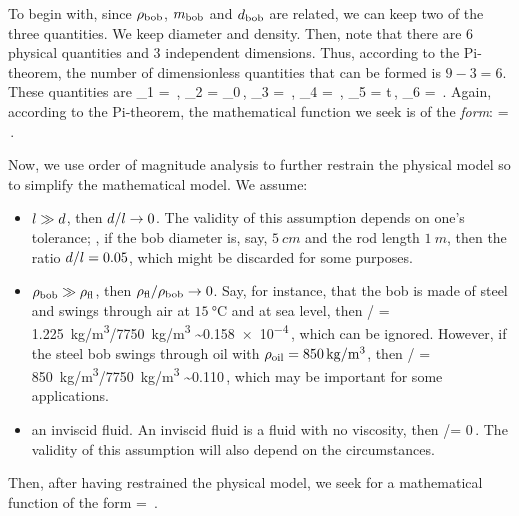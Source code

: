 To begin with, since $\rho_\text{bob}$, $m_\text{bob}$ and $d_\text{bob}$ are related, we can keep two of the three quantities. We keep diameter and density. Then, note that there are 6 physical quantities and 3 independent dimensions. Thus, according to the Pi-theorem, the number of dimensionless quantities that can be formed is $9 - 3 = 6$. These quantities are
\beq
\kdim_1 = \angpos\,,\quad
\kdim_2 = \angpos_0\,,\quad
\kdim_3 = \dfrac{\diam}{\length}\,,\quad
\kdim_4 = \,,\quad
\kdim_5 = t\sqrt{\dfrac{\grav}{\length}}\,,\quad
\kdim_6 = \,.
\eeq
Again, according to the Pi-theorem, the mathematical function we seek is of the \emph{form}:
\beq
\angpos = \kdimf{}\,.
\eeq

Now, we use order of magnitude analysis to further restrain the physical model so to simplify the mathematical model. We assume:
\begin{itemize}
\item $l\gg d$, then $d/l\to 0$. The validity of this assumption depends on one's tolerance; \eg, if the bob diameter is, say, $\SI{5}{cm}$ and the rod length $\SI{1}{m}$, then the ratio $d/l = 0.05$, which might be discarded for some purposes.
%
\item $\rho_\text{bob}\gg\rho_\text{fl}$, then $\rho_\text{fl}/\rho_\text{bob}\to 0$. Say, for instance, that the bob is made of steel and swings through air at $\SI{15}{\celsius}$ and at sea level, then 
\beq
\dens{}/\dens{} = \SI{1.225}{kg/m^3}/\SI{7750}{kg/m^3} \sim \num{0.158e-4}\,, 
\eeq
which can be ignored. However, if the steel bob swings through oil with $\rho_\text{oil} = \SI{850}{kg/m^3}$, then 
\beq
\dens{}/\dens{} = \SI{850}{kg/m^3}/\SI{7750}{kg/m^3} \sim \num{0.110}\,, 
\eeq
which may be important for some applications.
%
\item an inviscid fluid. An inviscid fluid is a fluid with no viscosity, then 
\beq
\dens{}\diam\sqrt{\length\grav}/\dynvis = 0\,. 
\eeq
The validity of this assumption will also depend on the circumstances.
\end{itemize}

Then, after having restrained the physical model, we seek for a mathematical function of the form
\beq
\angpos = \kdimf{}\,.
\eeq

